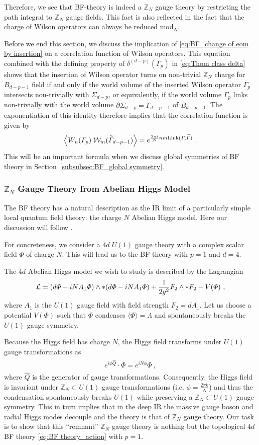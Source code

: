\documentclass[11pt]{article}
\newcommand{\eq}[1]{\begin{align}\begin{split}#1\end{split}\end{align}}
\def\CL {{\cal L}}
\def\CW {{\cal W}}
\def\IZ{{\mathbb{Z}}}
\def\beq{\begin{equation}}
\def\eeq{\end{equation}}
\begin{document}
Therefore, we see that BF-theory is indeed a $\IZ_N$ gauge theory by restricting the path integral to $\IZ_N$ gauge fields. This fact is also reflected in the fact that  the charge of Wilson operators can always be reduced mod$_N$.  

Before we end this section, we discuss the implication of \eqref{eq:BF_change of eom by insertion} on a correlation function of Wilson operators. This equation  combined with the defining property of $\delta^{(d-p)}(\Gamma_p)$  in \eqref{eq:Thom class delta} shows that the insertion of Wilson operator turns on non-trivial $\IZ_N$ charge for $B_{d-p-1}$ field if and only if the world volume of the inserted Wilson operator $\Gamma_p$ intersects non-trivially with $\Sigma_{d-p}$, or equivalently, if the world volume $\Gamma_p$ links non-trivially with the world volume $\partial \Sigma_{d-p} = \widetilde\Gamma_{d-p-1}$ of $B_{d-p-1}$. The exponentiation of this identity  therefore implies that  the correlation function is given by 
%
\beq
\left\langle W_n(\Gamma_p) \;  \CW_m(\widetilde\Gamma_{d-p-1}) \right\rangle = e^{\frac{2\pi i}{N} n m \text{Link} (\Gamma, \widetilde\Gamma)}~.
\eeq
%
This will be an important formula when we discuss global symmetries of BF theory in Section~\ref{subsubsec:BF_global symmetry}.



\subsubsection{$\IZ_N$ Gauge Theory from Abelian Higgs Model}
\label{subsubsec:BF from AHM}

The BF theory has a natural description as the IR limit of a particularly simple local quantum field theory: the charge $N$ Abelian Higgs model. Here our discussion will follow \cite{Banks:2010zn,Nakahara:2003nw}.

For concreteness, we consider a $4d$ $U(1)$ gauge theory with a complex scalar field $\Phi$ of charge $N$. This will lead us to the BF theory with $p=1$ and $d=4$.

The  4$d$ Abelian Higgs model we wish to study is described by the Lagrangian 
%
\eq{
\CL=(d\Phi-i N A_1\Phi)\wedge \ast (d\Phi-i N A_1\Phi)+\frac{1}{2g^2}F_2\wedge \ast F_2 -V(\Phi)~,
}
where $A_1$ is the $U(1)$ gauge field with field strength $F_2=dA_1$. 
Let us choose a potential $V(\Phi)$ such that $\Phi$ condenses $\langle \Phi\rangle=\Lambda$ and spontaneously breaks the $U(1)$ gauge symmetry. 

Because the Higgs field has charge $N$, the Higgs field transforms under $U(1)$ gauge transformations as 
\eq{
e^{i \phi \hat{Q}}\cdot \Phi= e^{ i N \phi}\Phi~,
}
where $\hat{Q}$ is the generator of gauge transformations. 
Consequently, the Higgs field is invariant under $\IZ_N \subset U(1)$ gauge transformations (i.e. $\phi=\frac{2\pi k}{N}$) and thus the condensation spontaneously breaks $U(1)$ while preserving a $\IZ_N\subset U(1)$ gauge symmetry. This in turn implies that in the deep IR the massive gauge boson and radial Higgs modes decouple and the theory is that of $\IZ_N$ gauge theory. Our task is to show that this ``remnant'' $\IZ_N$ gauge theory is nothing but the topological $4d$ BF theory \eqref{eq:BF theory_action} with $p=1$. 
\end{document}
